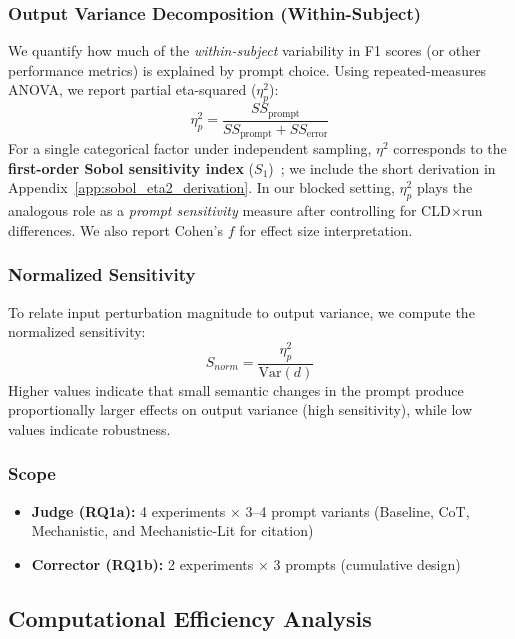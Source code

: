 \subsubsection{Output Variance Decomposition (Within-Subject)}
We quantify how much of the \emph{within-subject} variability in F1 scores (or other performance metrics) is explained by prompt choice. Using repeated-measures ANOVA, we report partial eta-squared ($\eta^2_p$):
\begin{equation}
\eta^2_p = \frac{SS_{\text{prompt}}}{SS_{\text{prompt}} + SS_{\text{error}}}
\end{equation}
For a single categorical factor under independent sampling, $\eta^2$ corresponds to the \textbf{first-order Sobol sensitivity index} ($S_1$)~\cite{saltelli2010variance}; we include the short derivation in Appendix~\ref{app:sobol_eta2_derivation}. In our blocked setting, $\eta^2_p$ plays the analogous role as a \emph{prompt sensitivity} measure after controlling for CLD$\times$run differences. We also report Cohen's $f$ for effect size interpretation.

\subsubsection{Normalized Sensitivity}
To relate input perturbation magnitude to output variance, we compute the normalized sensitivity:
\begin{equation}
S_{norm} = \frac{\eta^2_p}{\text{Var}(d)}
\end{equation}
Higher values indicate that small semantic changes in the prompt produce proportionally larger effects on output variance (high sensitivity), while low values indicate robustness.

\subsubsection{Scope}
\begin{itemize}[noitemsep]
    \item \textbf{Judge (RQ1a):} 4 experiments $\times$ 3--4 prompt variants (Baseline, CoT, Mechanistic, and Mechanistic-Lit for citation)
    \item \textbf{Corrector (RQ1b):} 2 experiments $\times$ 3 prompts (cumulative design)
\end{itemize}

\subsection{Computational Efficiency Analysis}

